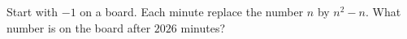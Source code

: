 Start with $-1$ on a board. Each minute replace the number $n$ by $n^2-n$. What number is on the board after $2026$ minutes?
